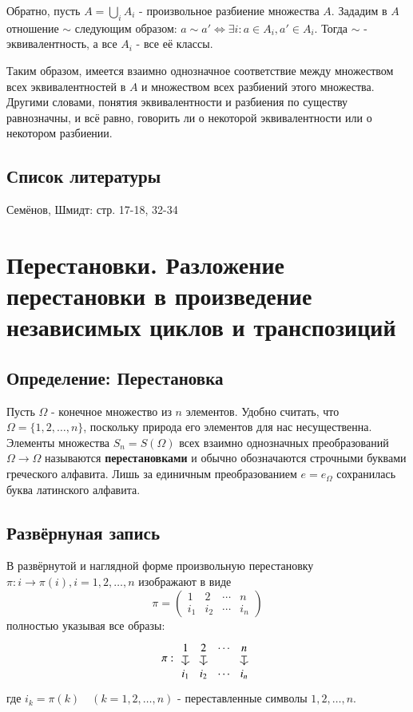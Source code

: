 \documentclass{article}
\begin{document}
Обратно, пусть $A = \underset{i}{\bigcup}A_i$ - произвольное разбиение множества $A$. Зададим в $A$ отношение $\sim$ следующим образом: $a \sim a' \Leftrightarrow \exists i : a \in A_i, a' \in A_i$. Тогда $\sim$ - эквивалентность, а все $A_i$ - все её классы.

Таким образом, имеется взаимно однозначное соответствие между множеством всех эквивалентностей в $A$ и множеством всех разбиений этого множества. Другими словами, понятия эквивалентности и разбиения по существу равнозначны, и всё равно, говорить ли о некоторой эквивалентности или о некотором разбиении.

\subsection*{Список литературы}
Семёнов, Шмидт: стр. 17-18, 32-34


\newpage
\section{Перестановки. Разложение перестановки в произведение независимых циклов и транспозиций}
\subsection{Определение: Перестановка}
Пусть $\Omega$ - конечное множество из $n$ элементов. Удобно считать, что $\Omega = \{1, 2, \dots, n\}$, поскольку природа его элементов для нас несущественна. Элементы множества $S_n = S(\Omega)$ всех взаимно однозначных преобразований $\Omega \rightarrow \Omega$ называются \textbf{перестановками} и обычно обозначаются строчными буквами греческого алфавита. Лишь за единичным преобразованием $e = e_\Omega$ сохранилась буква латинского алфавита.

\subsection{Развёрнуная запись}
В развёрнутой и наглядной форме произвольную перестановку $\pi : i \rightarrow \pi(i), i = 1, 2, \dots, n$ изображают в виде \[
\pi = \left(\begin{matrix}1 & 2 & \cdots & n \\ i_1 & i_2 & \cdots & i_n \end{matrix} \right)
\] полностью указывая все образы: \[
\pi: 
\begin{tikzcd}[column sep=0.5, row sep=small]
1 \dar[mapsto]	& 2 \dar[mapsto]	& \cdots	& n \dar[mapsto] \\
i_1 			& i_2 				& \cdots 	& i_n
\end{tikzcd}
\] где $i_k = \pi(k) \quad (k = 1, 2, \dots, n)$ - переставленные символы $1, 2, \dots, n$.
\end{document}
